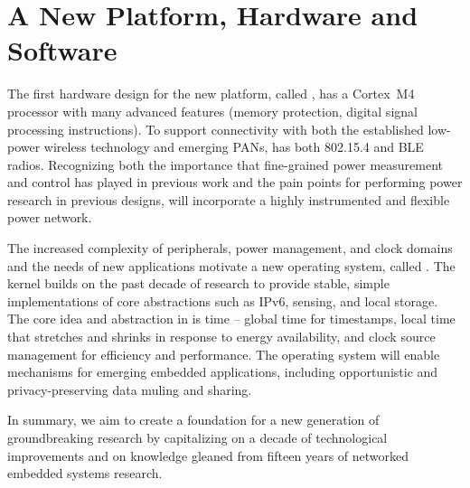 \section{A New Platform, Hardware and Software}

The first hardware design for the new platform, called \namedevice, has a
Cortex~M4 processor with many advanced features (memory protection,
digital signal processing instructions).  To support connectivity with
both the established low-power wireless technology and emerging PANs,
\namedevice has both 802.15.4 and BLE radios.  Recognizing both the
importance that fine-grained power measurement and control has played
in previous work and the pain points for performing power research in
previous designs, \namedevice will incorporate a highly instrumented and
flexible power network.

The increased complexity of peripherals, power management, and clock
domains and the needs of new applications
motivate a new operating system, called \nameos. The \nameos kernel builds
on the past decade of research to provide stable, simple implementations of
core abstractions such as IPv6, sensing, and local storage. 
The core idea and abstraction in \nameos is time -- global time for timestamps,
local time that stretches and shrinks in response to energy availability, and
clock source management for efficiency and performance.
The operating system will enable mechanisms for emerging embedded applications,
including opportunistic and privacy-preserving data muling and sharing.

In summary, we aim to create a foundation for a new generation of
groundbreaking research by capitalizing on a decade of technological
improvements and on knowledge gleaned from fifteen years of
networked embedded systems research.





